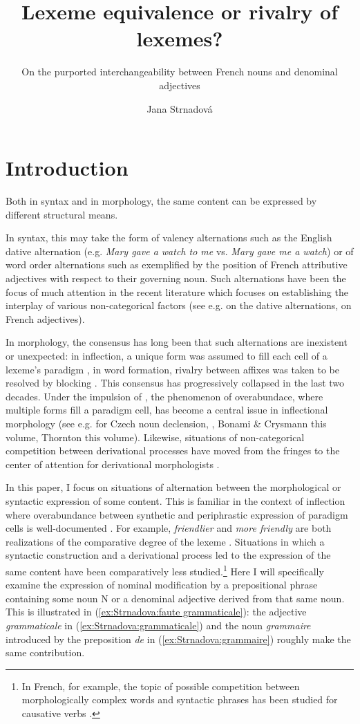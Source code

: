 \documentclass[output=paper]{LSP/langsci}
\author{Jana Strnadová\affiliation{Google, inc.}}
\title{Lexeme equivalence or rivalry of lexemes?}
\subtitle{On the purported interchangeability between French nouns and denominal adjectives}
\begin{document}


\section{Introduction}

Both in syntax and in morphology, the same  content can be expressed by different structural means.

In syntax, this may take the form of valency alternations such as the English dative alternation (e.g. \emph{Mary gave a watch to me} vs. \emph{Mary gave me a watch}) or of word order alternations such as exemplified by the position of French attributive adjectives with respect to their governing noun. Such alternations have been the focus of much attention in the recent literature which focuses on establishing the interplay of various non-categorical factors (see e.g. \citealt{bresnan2007}  on the dative alternations, \citealt{thuilier2012}  on French adjectives).

In morphology, the consensus has long been that such alternations are inexistent or unexpected: in inflection, a unique form was assumed to fill each cell of a lexeme's paradigm \citep{Anderson92, Stump01}, in word formation, rivalry between affixes was taken to be resolved by blocking \citep{Aronoff1976}. This consensus has progressively collapsed in the last two decades. Under the impulsion of \citet{Thornton12}, the phenomenon of overabundace, where multiple forms fill a paradigm cell, has become a central issue in inflectional morphology (see e.g. \citealt{bermel} for Czech noun declension, \citealt{Stump16}, Bonami \& Crysmann this volume, Thornton this volume). Likewise, situations of non-categorical competition between derivational processes have moved from the fringes \citep{rainer1988, Plag1999} to the center of  attention for derivational morphologists \citep{Lindsay2013, villoing2009vn,Tribout2010a, fradin2012moyen, koehl2012, namer2013, strnadova2014}.

In this paper, I focus on situations of alternation between the morphological or syntactic expression of some content. This is familiar in the context of inflection where overabundance between synthetic and periphrastic expression of paradigm cells is well-documented \citep{aronofflindsay2014, bonami2015}. For example, \emph{friendlier} and \emph{more friendly} are both realizations of the comparative degree of the lexeme . Situations in which a syntactic construction and a derivational process led to the expression of the same content have been comparatively less studied.\footnote{In French, for example, the topic of possible competition between morphologically complex words and syntactic phrases has been studied for causative verbs \citep{dalnamer2003cause}.} Here I will specifically examine the expression of  nominal modification by a prepositional phrase containing some noun N or a denominal adjective derived from that same noun. This is illustrated in (\ref{ex:Strnadova:faute grammaticale}): the adjective \emph{grammaticale} in (\ref{ex:Strnadova:grammaticale}) and the noun \emph{grammaire} introduced by the preposition \emph{de} in (\ref{ex:Strnadova:grammaire}) roughly make  the same contribution.
\end{document}
